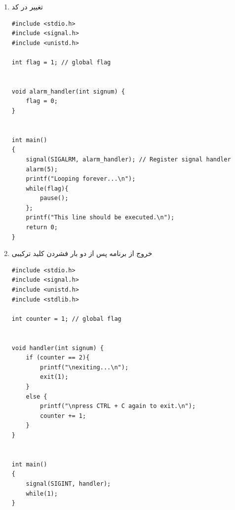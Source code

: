\begin{enumerate}
	\item تغییر در کد
	\begin{Verbatim}[tabsize=4]
#include <stdio.h>
#include <signal.h>
#include <unistd.h>

int flag = 1; // global flag


void alarm_handler(int signum) {
	flag = 0;
}


int main() 
{
	signal(SIGALRM, alarm_handler); // Register signal handler
	alarm(5);
	printf("Looping forever...\n");
	while(flag){
		pause();
	};
	printf("This line should be executed.\n");
	return 0;
}
	\end{Verbatim}
	\item خروج از برنامه پس از دو بار فشردن کلید ترکیبی 
	\begin{Verbatim}[tabsize=4]
#include <stdio.h>
#include <signal.h>
#include <unistd.h>
#include <stdlib.h>

int counter = 1; // global flag


void handler(int signum) {
	if (counter == 2){
		printf("\nexiting...\n");
		exit(1);
	}
	else {
		printf("\npress CTRL + C again to exit.\n");
		counter += 1;
	}
}


int main() 
{
	signal(SIGINT, handler);
	while(1);
}
	\end{Verbatim}
\end{enumerate}


